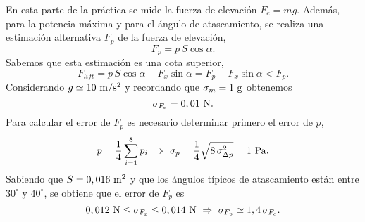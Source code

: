 En esta parte de la pr\'actica se mide la fuerza de elevaci\'on $F_e = mg$. Adem\'as, para la potencia m\'axima y para el \'angulo de atascamiento, se realiza una estimaci\'on alternativa $F_p$ de la fuerza de elevaci\'on,
%
\begin{equation*}
  F_p = p\,S\cos\alpha.
\end{equation*}
%
Sabemos que esta estimaci\'on es una cota superior,
%
\begin{equation*}
  F_{lift} = p\,S\cos\alpha - F_x\sin\alpha = F_p - F_x\sin\alpha < F_p.
\end{equation*}
%
Considerando $g \simeq 10~{\rm m/s^2}$ y recordando que $\sigma_m = 1~{\rm g}$ obtenemos
%
\begin{equation*}
  \sigma_{F_e} = 0,01~{\rm N}.
\end{equation*}
%
Para calcular el error de $F_p$ es necesario determinar primero el error de $p$,
%
\begin{equation*}
  p = \frac{1}{4}\sum_{i=1}^{8} p_i ~\Rightarrow~ \sigma_p = \frac{1}{4}\sqrt{8\,\sigma_{\Delta p}^2} = 1~{\rm Pa}.
\end{equation*}
%
Sabiendo que $S = 0,016~{\rm m^2}$ y que los \'angulos t\'ipicos de atascamiento est\'an entre $30^{\circ}$ y $40^{\circ}$, se obtiene que el error de $F_p$ es
%
\begin{equation*}
  0,012~{\rm N} \leq \sigma_{F_p} \leq 0,014~{\rm N} ~\Rightarrow~ \sigma_{F_p} \simeq 1,4\,\sigma_{F_e}.
\end{equation*}

